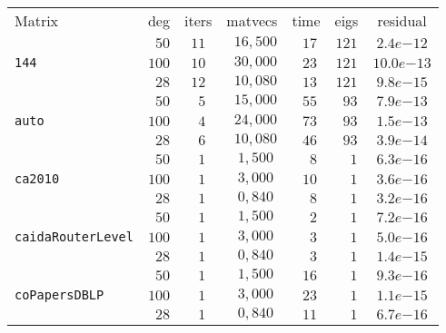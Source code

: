 \begin{tabular}{l|c|c|c|c|c|c}
\hline
\multirow{2}{*}{Matrix} & \multirow{2}{*}{deg} & \multirow{2}{*}{iters} & \multirow{2}{*}{matvecs} & \multirow{2}{*}{time} & \multirow{2}{*}{eigs} & \multirow{2}{*}{residual} \\
 & & & & & & \\\hline
\hline
 & $\phantom{0}50$ & $11$ & $\phantom{0}16,500$ & $\phantom{0}17$ & $121$ & $2.4e{-12}$ \\
\verb|144| & $100$ & $10$ & $\phantom{0}30,000$ & $\phantom{0}23$ & $121$ & $10.0e{-13}$ \\
 & $\phantom{0}28$ & $12$ & $\phantom{0}10,080$ & $\phantom{0}13$ & $121$ & $9.8e{-15}$ \\\hline
 & $\phantom{0}50$ & $\phantom{0}5$ & $\phantom{0}15,000$ & $\phantom{0}55$ & $\phantom{0}93$ & $7.9e{-13}$ \\
\verb|auto| & $100$ & $\phantom{0}4$ & $\phantom{0}24,000$ & $\phantom{0}73$ & $\phantom{0}93$ & $1.5e{-13}$ \\
 & $\phantom{0}28$ & $\phantom{0}6$ & $\phantom{0}10,080$ & $\phantom{0}46$ & $\phantom{0}93$ & $3.9e{-14}$ \\\hline
 & $\phantom{0}50$ & $\phantom{0}1$ & $\phantom{0}1,500$ & $\phantom{00}8$ & $\phantom{00}1$ & $6.3e{-16}$ \\
\verb|ca2010| & $100$ & $\phantom{0}1$ & $\phantom{0}3,000$ & $\phantom{0}10$ & $\phantom{00}1$ & $3.6e{-16}$ \\
 & $\phantom{0}28$ & $\phantom{0}1$ & $\phantom{0}0,840$ & $\phantom{00}8$ & $\phantom{00}1$ & $3.2e{-16}$ \\\hline
 & $\phantom{0}50$ & $\phantom{0}1$ & $\phantom{0}1,500$ & $\phantom{00}2$ & $\phantom{00}1$ & $7.2e{-16}$ \\
\verb|caidaRouterLevel| & $100$ & $\phantom{0}1$ & $\phantom{0}3,000$ & $\phantom{00}3$ & $\phantom{00}1$ & $5.0e{-16}$ \\
 & $\phantom{0}28$ & $\phantom{0}1$ & $\phantom{0}0,840$ & $\phantom{00}3$ & $\phantom{00}1$ & $1.4e{-15}$ \\\hline
 & $\phantom{0}50$ & $\phantom{0}1$ & $\phantom{0}1,500$ & $\phantom{0}16$ & $\phantom{00}1$ & $9.3e{-16}$ \\
\verb|coPapersDBLP| & $100$ & $\phantom{0}1$ & $\phantom{0}3,000$ & $\phantom{0}23$ & $\phantom{00}1$ & $1.1e{-15}$ \\
 & $\phantom{0}28$ & $\phantom{0}1$ & $\phantom{0}0,840$ & $\phantom{0}11$ & $\phantom{00}1$ & $6.7e{-16}$ \\\hline

\end{tabular}
